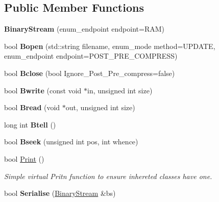 \subsection*{Public Member Functions}
\begin{DoxyCompactItemize}
\item 
\hypertarget{classBinaryStream_af65088798a6f0808f30f906e59902007}{{\bfseries Binary\-Stream} (enum\-\_\-endpoint endpoint=R\-A\-M)}\label{classBinaryStream_af65088798a6f0808f30f906e59902007}

\item 
\hypertarget{classBinaryStream_a275275e82cf87833f1f1b053d65774f2}{bool {\bfseries Bopen} (std\-::string filename, enum\-\_\-mode method=U\-P\-D\-A\-T\-E, enum\-\_\-endpoint endpoint=P\-O\-S\-T\-\_\-\-P\-R\-E\-\_\-\-C\-O\-M\-P\-R\-E\-S\-S)}\label{classBinaryStream_a275275e82cf87833f1f1b053d65774f2}

\item 
\hypertarget{classBinaryStream_a05975e038070b0fc7796c807bf42813d}{bool {\bfseries Bclose} (bool Ignore\-\_\-\-Post\-\_\-\-Pre\-\_\-compress=false)}\label{classBinaryStream_a05975e038070b0fc7796c807bf42813d}

\item 
\hypertarget{classBinaryStream_a7fde80b6a974f1eb31e89fb5b36a90ab}{bool {\bfseries Bwrite} (const void $\ast$in, unsigned int size)}\label{classBinaryStream_a7fde80b6a974f1eb31e89fb5b36a90ab}

\item 
\hypertarget{classBinaryStream_aed80ea557babddcc56c6b22ad58cbd3b}{bool {\bfseries Bread} (void $\ast$out, unsigned int size)}\label{classBinaryStream_aed80ea557babddcc56c6b22ad58cbd3b}

\item 
\hypertarget{classBinaryStream_ae2074057343fbfadb32ef74a444bf226}{long int {\bfseries Btell} ()}\label{classBinaryStream_ae2074057343fbfadb32ef74a444bf226}

\item 
\hypertarget{classBinaryStream_a9f4620b1b7d964bd4ef41bf7afbc7c84}{bool {\bfseries Bseek} (unsigned int pos, int whence)}\label{classBinaryStream_a9f4620b1b7d964bd4ef41bf7afbc7c84}

\item 
\hypertarget{classBinaryStream_a87160fadec72bf15857bd995134b2109}{bool \hyperlink{classBinaryStream_a87160fadec72bf15857bd995134b2109}{Print} ()}\label{classBinaryStream_a87160fadec72bf15857bd995134b2109}

\begin{DoxyCompactList}\small\item\em Simple virtual Pritn function to ensure inhereted classes have one. \end{DoxyCompactList}\item 
\hypertarget{classBinaryStream_a4f5fe9de799575950baba7d9a5ab68b9}{bool {\bfseries Serialise} (\hyperlink{classBinaryStream}{Binary\-Stream} \&bs)}\label{classBinaryStream_a4f5fe9de799575950baba7d9a5ab68b9}


\end{DoxyCompactItemize}
